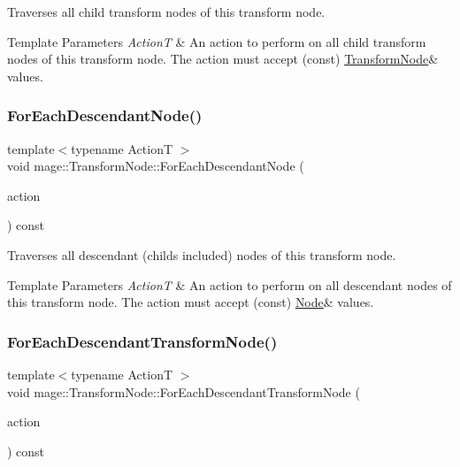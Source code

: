 Traverses all child transform nodes of this transform node.


\begin{DoxyTemplParams}{Template Parameters}
{\em ActionT} & An action to perform on all child transform nodes of this transform node. The action must accept ({\ttfamily const}) {\ttfamily \hyperlink{classmage_1_1_transform_node}{Transform\+Node}\&} values. \\
\hline
\end{DoxyTemplParams}
\hypertarget{classmage_1_1_transform_node_a696d23bd936d3c3f880cb8b5cfd54d80}{}\label{classmage_1_1_transform_node_a696d23bd936d3c3f880cb8b5cfd54d80} 
\subsubsection{\texorpdfstring{For\+Each\+Descendant\+Node()}{ForEachDescendantNode()}}
{\footnotesize\ttfamily template$<$typename ActionT $>$ \\
void mage\+::\+Transform\+Node\+::\+For\+Each\+Descendant\+Node (\begin{DoxyParamCaption}\item[{ActionT}]{action }\end{DoxyParamCaption}) const\hspace{0.3cm}{\ttfamily [private]}}

Traverses all descendant (childs included) nodes of this transform node.


\begin{DoxyTemplParams}{Template Parameters}
{\em ActionT} & An action to perform on all descendant nodes of this transform node. The action must accept ({\ttfamily const}) {\ttfamily \hyperlink{classmage_1_1_node}{Node}\&} values. \\
\hline
\end{DoxyTemplParams}
\hypertarget{classmage_1_1_transform_node_a7a052715d9591defa06e494017539711}{}\label{classmage_1_1_transform_node_a7a052715d9591defa06e494017539711} 
\subsubsection{\texorpdfstring{For\+Each\+Descendant\+Transform\+Node()}{ForEachDescendantTransformNode()}}
{\footnotesize\ttfamily template$<$typename ActionT $>$ \\
void mage\+::\+Transform\+Node\+::\+For\+Each\+Descendant\+Transform\+Node (\begin{DoxyParamCaption}\item[{ActionT}]{action }\end{DoxyParamCaption}) const\hspace{0.3cm}{\ttfamily [private]}}

